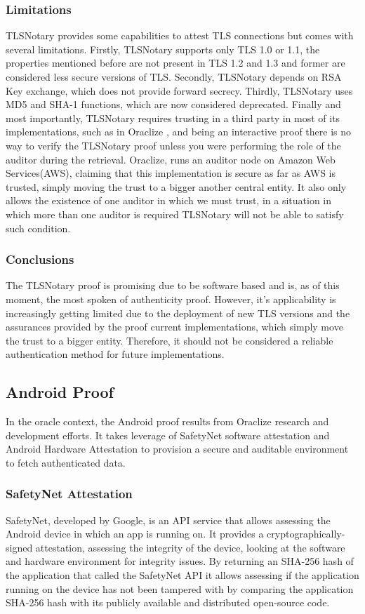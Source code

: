 \subsubsection{Limitations}
TLSNotary provides some capabilities to attest TLS connections but comes with several limitations. Firstly, TLSNotary supports only TLS 1.0 or 1.1, the properties mentioned before are not present in TLS 1.2 and 1.3 and former are considered less secure versions of TLS. Secondly, TLSNotary depends on RSA Key exchange, which does not provide forward secrecy. Thirdly, TLSNotary uses MD5 and SHA-1 functions, which are now considered deprecated. Finally and most importantly, TLSNotary requires trusting in a third party in most of its implementations, such as in Oraclize \cite{Oraclize.it2018OraclizeDocumentation}, and being an interactive proof there is no way to verify the TLSNotary proof unless you were performing the role of the auditor during the retrieval. Oraclize, runs an auditor node on Amazon Web Services(AWS), claiming that this implementation is secure as far as AWS is trusted, simply moving the trust to a bigger another central entity. It also only allows the existence of one auditor in which we must trust, in a situation in which more than one auditor is required TLSNotary will not be able to satisfy such condition.


\subsubsection{Conclusions}
The TLSNotary proof is promising due to be software based and is, as of this moment, the most spoken of authenticity proof. However, it's applicability is increasingly getting limited due to the deployment of new TLS versions and the assurances provided by the proof current implementations, which simply move the trust to a bigger entity. Therefore, it should not be considered a reliable authentication method for future implementations.

\subsection{Android Proof}
In the oracle context, the Android proof results from Oraclize research and development efforts. It takes leverage of SafetyNet software attestation and Android Hardware Attestation to provision a secure and auditable environment to fetch authenticated data.

\subsubsection{SafetyNet Attestation}
SafetyNet, developed by Google, is an API service that allows assessing the Android device in which an app is running on. It provides a cryptographically-signed attestation, assessing the integrity of the device, looking at the software and hardware environment for integrity issues. By returning an SHA-256 hash of the application that called the SafetyNet API it allows assessing if the application running on the device has not been tampered with by comparing the application SHA-256 hash with its publicly available and distributed open-source code.

